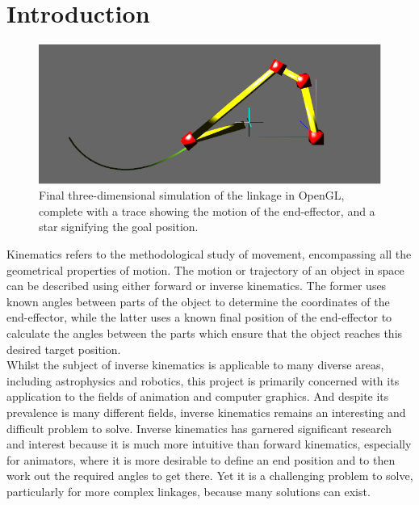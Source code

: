 \documentclass[paper=a4, fontsize=11pt]{scrartcl} %
\numberwithin{equation}{section} %
\numberwithin{figure}{section} %
\numberwithin{table}{section} %
\begin{document}
\section{Introduction}
\begin{figure}
\centering
\includegraphics[scale=0.4]{chain3Dexamplev2}
\caption{Final three-dimensional simulation of the linkage in OpenGL, complete with a trace showing the motion of the end-effector, and a star signifying the goal position.}
\label{fig:3Dpicture}
\end{figure}

Kinematics refers to the methodological study of movement, encompassing all the geometrical properties of motion. The motion or trajectory of an object in space can be described using either forward or inverse kinematics. The former uses known angles between parts of the object to determine the coordinates of the end-effector, while the latter uses a known final position of the end-effector to calculate the angles between the parts which ensure that the object reaches this desired target position. \\

Whilst the subject of inverse kinematics is applicable to many diverse areas, including astrophysics and robotics, this project is primarily concerned with its application to the fields of animation and computer graphics. And despite its prevalence is many different fields, inverse kinematics remains an interesting and difficult problem to solve. Inverse kinematics has garnered significant research and interest because it is much more intuitive than forward kinematics, especially for animators, where it is more desirable to define an end position and to then work out the required angles to get there. Yet it is a challenging problem to solve, particularly for more complex linkages, because many solutions can exist. \\
\end{document}

